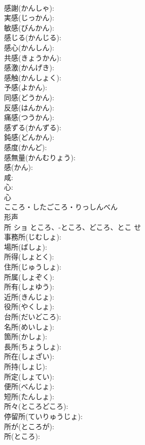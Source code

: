 \documentclass[8pt]{extreport}
\begin{document}
\begin{CJK}{UTF8}{min}
\\	感謝(かんしゃ): 
\\	実感(じっかん): 
\\	敏感(びんかん): 
\\	感じる(かんじる): 
\\	感心(かんしん): 
\\	共感(きょうかん): 
\\	感激(かんげき): 
\\	感触(かんしょく): 
\\	予感(よかん): 
\\	同感(どうかん): 
\\	反感(はんかん): 
\\	痛感(つうかん): 
\\	感ずる(かんずる): 
\\	鈍感(どんかん): 
\\	感度(かんど): 
\\	感無量(かんむりょう): 
\\	感(かん): 
\\	咸: 
\\	心: 
\\	心	
\\	こころ・したごころ・りっしんべん	
\\	形声 
\\	所	ショ	ところ、-ところ、どころ、とこ	せ	
\\	事務所(じむしょ): 
\\	場所(ばしょ): 
\\	所得(しょとく): 
\\	住所(じゅうしょ): 
\\	所属(しょぞく): 
\\	所有(しょゆう): 
\\	近所(きんじょ): 
\\	役所(やくしょ): 
\\	台所(だいどころ): 
\\	名所(めいしょ): 
\\	箇所(かしょ): 
\\	長所(ちょうしょ): 
\\	所在(しょざい): 
\\	所持(しょじ): 
\\	所定(しょてい): 
\\	便所(べんじょ): 
\\	短所(たんしょ): 
\\	所々(ところどころ): 
\\	停留所(ていりゅうじょ): 
\\	所が(ところが): 
\\	所(ところ): 

\end{CJK}
\end{document}
